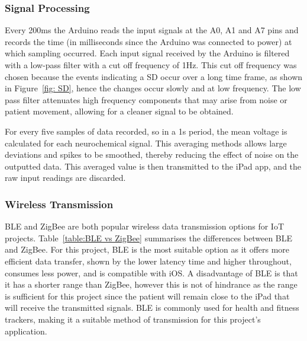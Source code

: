 \subsubsection{Signal Processing}
Every 200ms the Arduino reads the input signals at the A0, A1 and A7 pins and records the time (in milliseconds since the Arduino was connected to power) at which sampling occurred. Each input signal received by the Arduino is filtered with a low-pass filter with a cut off frequency of 1Hz. This cut off frequency was chosen because the events indicating a SD occur over a long time frame, as shown in Figure~\ref{fig: SD}, hence the changes occur slowly and at low frequency. The low pass filter attenuates high frequency components that may arise from noise or patient movement, allowing for a cleaner signal to be obtained.

For every five samples of data recorded, so in a 1s period, the mean voltage is calculated for each neurochemical signal. This averaging methods allows large deviations and spikes to be smoothed, thereby reducing the effect of noise on the outputted data. This averaged value is then transmitted to the iPad app, and the raw input readings are discarded.



\subsubsection{Wireless Transmission}
BLE and ZigBee are both popular wireless data transmission options for IoT projects. Table~\ref{table:BLE vs ZigBee} summarises the differences between BLE and ZigBee. For this project, BLE is the most suitable option as it offers more efficient data transfer, shown by the lower latency time and higher throughout, consumes less power, and is compatible with iOS. A disadvantage of BLE is that it has a shorter range than ZigBee, however this is not of hindrance as the range is sufficient for this project since the patient will remain close to the iPad that will receive the transmitted signals. BLE is commonly used for health and fitness trackers, making it a suitable method of transmission for this project's application.

